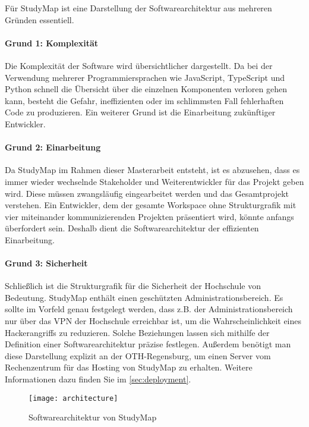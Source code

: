 Für StudyMap ist eine Darstellung der Softwarearchitektur aus mehreren Gründen essentiell.

\paragraph*{Grund 1: Komplexität}
Die Komplexität der Software wird übersichtlicher dargestellt. Da bei der Verwendung mehrerer Programmiersprachen wie JavaScript, TypeScript und Python schnell die Übersicht über die einzelnen Komponenten verloren gehen kann, besteht die Gefahr, ineffizienten oder im schlimmsten Fall fehlerhaften Code zu produzieren. Ein weiterer Grund ist die Einarbeitung zukünftiger Entwickler.

\paragraph*{Grund 2: Einarbeitung}
Da StudyMap im Rahmen dieser Masterarbeit entsteht, ist es abzusehen, dass es immer wieder wechselnde Stakeholder und Weiterentwickler für das Projekt geben wird. Diese müssen zwangsläufig eingearbeitet werden und das Gesamtprojekt verstehen. Ein Entwickler, dem der gesamte Workspace ohne Strukturgrafik mit vier miteinander kommunizierenden Projekten präsentiert wird, könnte anfangs überfordert sein. Deshalb dient die Softwarearchitektur der effizienten Einarbeitung.

\paragraph*{Grund 3: Sicherheit}
Schließlich ist die Strukturgrafik für die Sicherheit der Hochschule von Bedeutung. StudyMap enthält einen geschützten Administrationsbereich. Es sollte im Vorfeld genau festgelegt werden, dass z.B. der Administrationsbereich nur über das VPN der Hochschule erreichbar ist, um die Wahrscheinlichkeit eines Hackerangriffs zu reduzieren. Solche Beziehungen lassen sich mithilfe der Definition einer Softwarearchitektur präzise festlegen. Außerdem benötigt man diese Darstellung explizit an der OTH-Regensburg, um einen Server vom Rechenzentrum für das Hosting von StudyMap zu erhalten. Weitere Informationen dazu finden Sie im \autoref{sec:deployment}.

\begin{figure}[H]
    \centering
    \texttt{[image: architecture]}
    \caption{Softwarearchitektur von StudyMap}
    \label{fig:studymap-architecture}
\end{figure}

